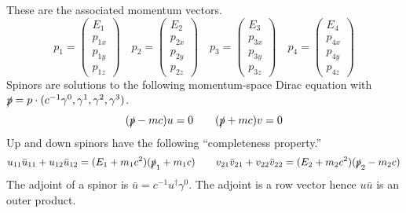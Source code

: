 \documentclass[12pt]{article}
\begin{document}
%
These are the associated momentum vectors.
$$
p_1=\begin{pmatrix}E_1\\p_{1x}\\p_{1y}\\p_{1z}\end{pmatrix}\quad
p_2=\begin{pmatrix}E_2\\p_{2x}\\p_{2y}\\p_{2z}\end{pmatrix}\quad
p_3=\begin{pmatrix}E_3\\p_{3x}\\p_{3y}\\p_{3z}\end{pmatrix}\quad
p_4=\begin{pmatrix}E_4\\p_{4x}\\p_{4y}\\p_{4z}\end{pmatrix}
$$
Spinors are solutions to the following momentum-space Dirac equation with
$\slashed{p}=p\cdot(c^{-1}\gamma^0,\gamma^1,\gamma^2,\gamma^3)$.
$$
(\slashed{p}-mc)u=0\qquad(\slashed{p}+mc)v=0
$$
Up and down spinors have the following ``completeness property.''
$$
u_{11}\bar{u}_{11}+u_{12}\bar{u}_{12}=(E_1+m_1c^2)(\slashed{p}_1+m_1c)\qquad
v_{21}\bar{v}_{21}+v_{22}\bar{v}_{22}=(E_2+m_2c^2)(\slashed{p}_2-m_2c)
$$
The adjoint of a spinor is $\bar{u}=c^{-1}u^\dag\gamma^0$.
The adjoint is a row vector hence $u\bar{u}$ is an outer product.
\end{document}
